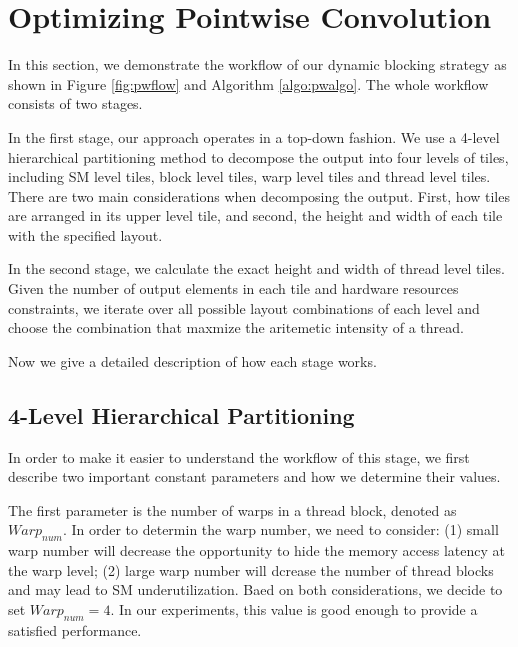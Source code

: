 \section{Optimizing Pointwise Convolution}
\label{sec:pwconv}
In this section, we demonstrate the workflow of our dynamic blocking strategy as shown in Figure \ref{fig:pwflow} and Algorithm \ref{algo:pwalgo}. 
The whole workflow consists of two stages. 

In the first stage, our approach operates in a top-down fashion. 
We use a 4-level hierarchical partitioning method to decompose the output into four levels of tiles, including SM level tiles, block level tiles, warp level tiles and thread level tiles. 
There are two main considerations when decomposing the output. First, how tiles are arranged in its upper level tile, and second, the height and width of each tile with the specified layout.

In the second stage, we calculate the exact height and width of thread level tiles. Given the number of output elements in each tile and hardware resources constraints, we iterate over all possible layout combinations of each level and choose the combination that maxmize the aritemetic intensity of a thread.

Now we give a detailed description of how each stage works.
\subsection{4-Level Hierarchical Partitioning}
In order to make it easier to understand the workflow of this stage, we first describe two important constant parameters and how we determine their values.

The first parameter is the number of warps in a thread block, denoted as $Warp_{num}$.
In order to determin the warp number, we need to consider: (1) small warp number will decrease the opportunity to hide the memory access latency at the warp level;
(2) large warp number will dcrease the number of thread blocks and may lead to SM underutilization.
Baed on both considerations, we decide to set $Warp_{num}=4$.
In our experiments, this value is good enough to provide a satisfied performance.


